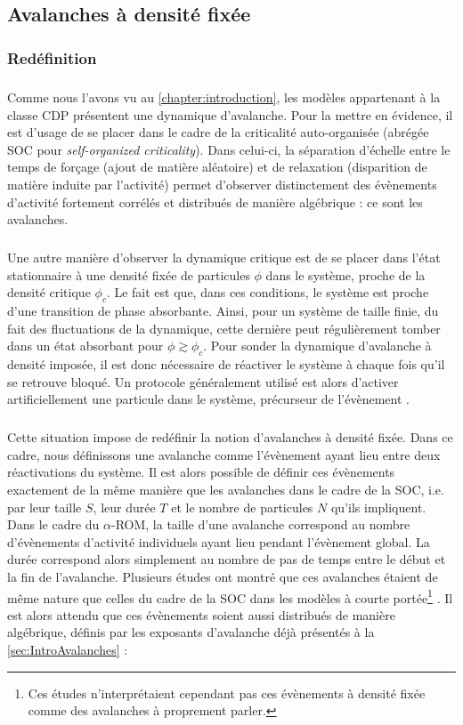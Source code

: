 \label{sec:AvSusp}

\subsection{Avalanches à densité fixée}

\subsubsection{Redéfinition}

\subparagraph{}Comme nous l'avons vu au \autoref{chapter:introduction}, les modèles appartenant à la classe CDP présentent une dynamique d'avalanche. Pour la mettre en évidence, il est d'usage de se placer dans le cadre de la criticalité auto-organisée (abrégée SOC pour \textit{self-organized criticality}). Dans celui-ci, la séparation d'échelle entre le temps de forçage (ajout de matière aléatoire) et de relaxation (disparition de matière induite par l'activité) permet d'observer distinctement des évènements d'activité fortement corrélés et distribués de manière algébrique : ce sont les avalanches.

\subparagraph{}Une autre manière d'observer la dynamique critique est de se placer dans l'état stationnaire à une densité fixée de particules $\phi$ dans le système, proche de la densité critique $\phi_c$. Le fait est que, dans ces conditions, le système est proche d'une transition de phase absorbante. Ainsi, pour un système de taille finie, du fait des fluctuations de la dynamique, cette dernière peut régulièrement tomber dans un état absorbant pour $\phi \gtrsim \phi_c$. Pour sonder la dynamique d'avalanche à densité imposée, il est donc nécessaire de réactiver le système à chaque fois qu'il se retrouve bloqué. Un protocole généralement utilisé est alors d'activer artificiellement une particule dans le système, précurseur de l'évènement \cite{lubeck_universal_2003, vespignani_absorbing_state_2000, munoz_avalanche_1999}.

\subparagraph{}Cette situation impose de redéfinir la notion d'avalanches à densité fixée. Dans ce cadre, nous définissons une avalanche comme l'évènement ayant lieu entre deux réactivations du système. Il est alors possible de définir ces évènements exactement de la même manière que les avalanches dans le cadre de la SOC, i.e. par leur taille $S$, leur durée $T$ et le nombre de particules $N$ qu'ils impliquent. Dans le cadre du $\alpha$-ROM, la taille d'une avalanche correspond au nombre d'évènements d'activité individuels ayant lieu pendant l'évènement global. La durée correspond alors simplement au nombre de pas de temps entre le début et la fin de l'avalanche. Plusieurs études ont montré que ces avalanches étaient de même nature que celles du cadre de la SOC dans les modèles à courte portée\footnote{Ces études n'interprétaient cependant pas ces évènements à densité fixée comme des avalanches à proprement parler.} \cite{lubeck_universal_2003, vespignani_absorbing_state_2000, munoz_avalanche_1999}. Il est alors attendu que ces évènements soient aussi distribués de manière algébrique, définis par les exposants d'avalanche déjà présentés à la \autoref{sec:IntroAvalanches} :

